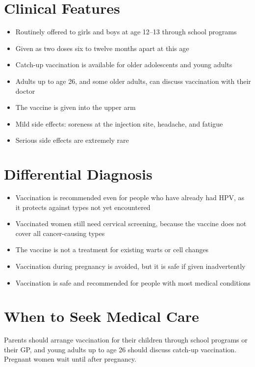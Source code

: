 \section*{Clinical Features}
\begin{itemize}
    \item Routinely offered to girls and boys at age 12--13 through school programs
    \item Given as two doses six to twelve months apart at this age
    \item Catch-up vaccination is available for older adolescents and young adults
    \item Adults up to age 26, and some older adults, can discuss vaccination with their doctor
    \item The vaccine is given into the upper arm
    \item Mild side effects: soreness at the injection site, headache, and fatigue
    \item Serious side effects are extremely rare
\end{itemize}

\section*{Differential Diagnosis}
\begin{itemize}
    \item Vaccination is recommended even for people who have already had HPV, as it protects against types not yet encountered
    \item Vaccinated women still need cervical screening, because the vaccine does not cover all cancer-causing types
    \item The vaccine is not a treatment for existing warts or cell changes
    \item Vaccination during pregnancy is avoided, but it is safe if given inadvertently
    \item Vaccination is safe and recommended for people with most medical conditions
\end{itemize}

\section*{When to Seek Medical Care}
Parents should arrange vaccination for their children through school programs or their GP, and young adults up to age 26 should discuss catch-up vaccination. Pregnant women wait until after pregnancy.

